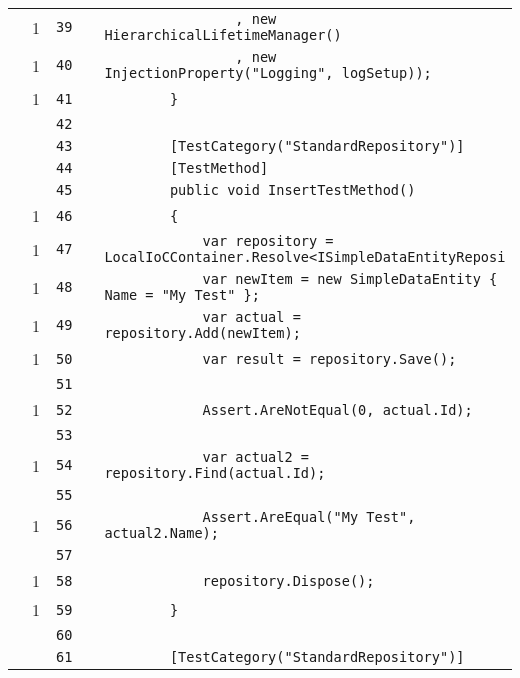 \documentclass[a4paper,10pt]{article}
\begin{document}
\begin{longtable}[l]{lrrll}
\cellcolor{green} & 1 & \verb~39~ & & \verb~                , new HierarchicalLifetimeManager()~\\
\cellcolor{green} & 1 & \verb~40~ & & \verb~                , new InjectionProperty("Logging", logSetup));~\\
\cellcolor{green} & 1 & \verb~41~ & & \verb~        }~\\
\cellcolor{gray} &  & \verb~42~ & & \verb~~\\
\cellcolor{gray} &  & \verb~43~ & & \verb~        [TestCategory("StandardRepository")]~\\
\cellcolor{gray} &  & \verb~44~ & & \verb~        [TestMethod]~\\
\cellcolor{gray} &  & \verb~45~ & & \verb~        public void InsertTestMethod()~\\
\cellcolor{green} & 1 & \verb~46~ & & \verb~        {~\\
\cellcolor{green} & 1 & \verb~47~ & & \verb~            var repository = LocalIoCContainer.Resolve<ISimpleDataEntityReposi~\\
\cellcolor{green} & 1 & \verb~48~ & & \verb~            var newItem = new SimpleDataEntity { Name = "My Test" };~\\
\cellcolor{green} & 1 & \verb~49~ & & \verb~            var actual = repository.Add(newItem);~\\
\cellcolor{green} & 1 & \verb~50~ & & \verb~            var result = repository.Save();~\\
\cellcolor{gray} &  & \verb~51~ & & \verb~~\\
\cellcolor{green} & 1 & \verb~52~ & & \verb~            Assert.AreNotEqual(0, actual.Id);~\\
\cellcolor{gray} &  & \verb~53~ & & \verb~~\\
\cellcolor{green} & 1 & \verb~54~ & & \verb~            var actual2 = repository.Find(actual.Id);~\\
\cellcolor{gray} &  & \verb~55~ & & \verb~~\\
\cellcolor{green} & 1 & \verb~56~ & & \verb~            Assert.AreEqual("My Test", actual2.Name);~\\
\cellcolor{gray} &  & \verb~57~ & & \verb~~\\
\cellcolor{green} & 1 & \verb~58~ & & \verb~            repository.Dispose();~\\
\cellcolor{green} & 1 & \verb~59~ & & \verb~        }~\\
\cellcolor{gray} &  & \verb~60~ & & \verb~~\\
\cellcolor{gray} &  & \verb~61~ & & \verb~        [TestCategory("StandardRepository")]~\\

\end{longtable}
\end{document}
